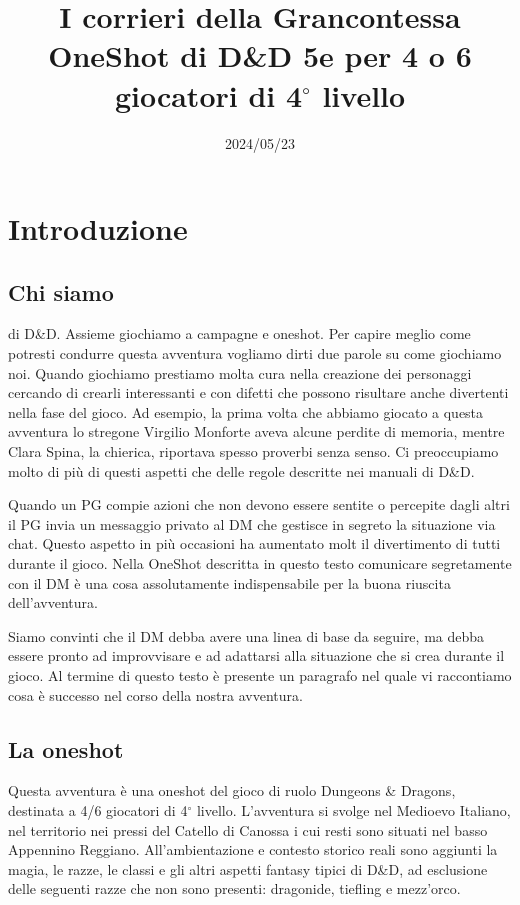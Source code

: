 \documentclass[letterpaper,twocolumn,openany,nodeprecatedcode]{dndbook}
\title{I corrieri della Grancontessa \\
\large OneShot di D\&D 5e per 4 o 6 giocatori di 4$^\circ$ livello}
\author{}
\date{2024/05/23}
\begin{document}
\frontmatter

\maketitle

\tableofcontents


\mainmatter%





\chapter{Introduzione}

\section{Chi siamo}
 di D\&D. Assieme giochiamo a campagne e oneshot. Per capire meglio come potresti condurre questa avventura vogliamo dirti due parole su come giochiamo noi. Quando giochiamo prestiamo molta cura nella creazione dei personaggi cercando di crearli interessanti e con difetti che possono risultare anche divertenti nella fase del gioco. Ad esempio, la prima volta che abbiamo giocato a questa avventura lo stregone Virgilio Monforte aveva alcune perdite di memoria, mentre Clara Spina, la chierica, riportava spesso proverbi senza senso. Ci preoccupiamo molto di più di questi aspetti che delle regole descritte nei manuali di D\&D. 

Quando un PG compie azioni che non devono essere sentite o percepite dagli altri il PG invia un messaggio privato al DM che gestisce in segreto la situazione via chat. Questo aspetto in più occasioni ha aumentato molt il divertimento di tutti durante il gioco. Nella OneShot descritta in questo testo comunicare segretamente con il DM è una cosa assolutamente indispensabile per la buona riuscita dell'avventura.

Siamo convinti che il DM debba avere una linea di base da seguire, ma debba essere pronto ad improvvisare e ad adattarsi alla situazione che si crea durante il gioco. Al termine di questo testo è presente un paragrafo nel quale vi raccontiamo cosa è successo nel corso della nostra avventura.

\section{La oneshot}
Questa avventura è una oneshot del gioco di ruolo Dungeons \& Dragons\cite{dnd:giocatore}, destinata a 4/6 giocatori di 4$^\circ$ livello. L'avventura si svolge nel Medioevo Italiano, nel territorio nei pressi del Catello di Canossa i cui resti sono situati nel basso Appennino Reggiano. All'ambientazione e contesto storico reali sono aggiunti la magia, le razze, le classi e gli altri aspetti fantasy tipici di D\&D, ad esclusione delle seguenti razze che non sono presenti: dragonide, tiefling e mezz'orco.
\end{document}
